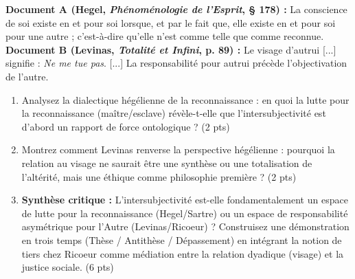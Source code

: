 \documentclass[11pt]{article}
\begin{document}
\begin{exercice}
\textbf{Document A (Hegel, \textit{Phénoménologie de l'Esprit}, § 178) :} \og La conscience de soi existe en et pour soi lorsque, et par le fait que, elle existe en et pour soi pour une autre ; c'est-à-dire qu'elle n'est comme telle que comme reconnue. \fg{}
\textbf{Document B (Levinas, \textit{Totalité et Infini}, p. 89) :} \og Le visage d'autrui [...] signifie : \textit{Ne me tue pas}. [...] La responsabilité pour autrui précède l'objectivation de l'autre. \fg{}

\begin{enumerate}
    \item Analysez la dialectique hégélienne de la reconnaissance : en quoi la lutte pour la reconnaissance (maître/esclave) révèle-t-elle que l'intersubjectivité est d'abord un rapport de force ontologique ? (2 pts)
    \item Montrez comment Levinas renverse la perspective hégélienne : pourquoi la relation au visage ne saurait être une \og synthèse \fg{} ou une \og totalisation \fg{} de l'altérité, mais une \og éthique comme philosophie première \fg{} ? (2 pts)
    \item \textbf{Synthèse critique :} \og L'intersubjectivité est-elle fondamentalement un espace de lutte pour la reconnaissance (Hegel/Sartre) ou un espace de responsabilité asymétrique pour l'Autre (Levinas/Ricoeur) ? \fg{} Construisez une démonstration en trois temps (Thèse / Antithèse / Dépassement) en intégrant la notion de \og tiers \fg{} chez Ricoeur comme médiation entre la relation dyadique (visage) et la justice sociale. (6 pts)
\end{enumerate}
\end{exercice}
\end{document}
